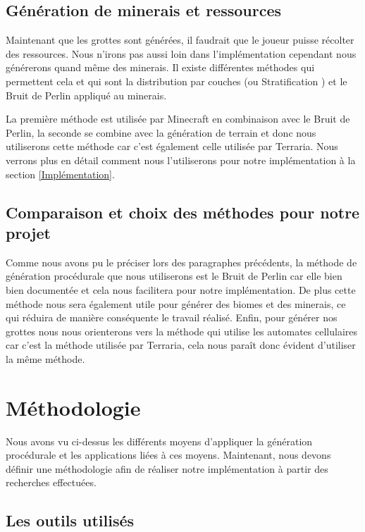 \documentclass{article}
\begin{document}
\subsection{Génération de minerais et ressources}

Maintenant que les grottes sont générées, il faudrait que le joueur puisse récolter des ressources. Nous n'irons pas aussi loin dans l'implémentation cependant nous générerons quand même des minerais. Il existe différentes méthodes qui permettent cela et qui sont la distribution par couches (ou Stratification \cite{stratification}) et le Bruit de Perlin appliqué au minerais. \par
La première méthode est utilisée par Minecraft en combinaison avec le Bruit de Perlin, la seconde se combine avec la génération de terrain et donc nous utiliserons cette méthode car c'est également celle utilisée par Terraria. Nous verrons plus en détail comment nous l'utiliserons pour notre implémentation à la section \ref{Implémentation}.

\subsection{Comparaison et choix des méthodes pour notre projet}

Comme nous avons pu le préciser lors des paragraphes précédents, la méthode de génération procédurale que nous utiliserons est le Bruit de Perlin car elle bien bien documentée et cela nous facilitera pour notre implémentation. De plus cette méthode nous sera également utile pour générer des biomes et des minerais, ce qui réduira de manière conséquente le travail réalisé. Enfin, pour générer nos grottes nous nous orienterons vers la méthode qui utilise les automates cellulaires car c'est la méthode utilisée par Terraria, cela nous paraît donc évident d'utiliser la même méthode. 

\section{Méthodologie}

Nous avons vu ci-dessus les différents moyens d'appliquer la génération procédurale et les applications liées à ces moyens. Maintenant, nous devons définir une méthodologie afin de réaliser notre implémentation à partir des recherches effectuées.

\subsection{Les outils utilisés}
\end{document}
